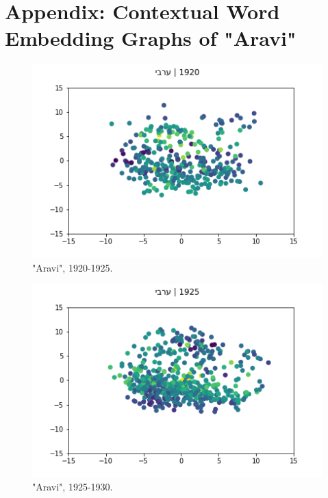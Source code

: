 \documentclass[10pt, a4paper]{article}
\begin{document}
\section*{Appendix: Contextual Word Embedding Graphs of "Aravi"}
\begin{figure}[!h]
\begin{center}
\includegraphics[scale=0.5]{LREC_PAPER/aravi_cwes/aravi_1920.png}
\caption{"Aravi", 1920-1925.}
\label{Aravi1}
\end{center}
\end{figure}

\begin{figure}[!h]
\begin{center}
\includegraphics[scale=0.5]{LREC_PAPER/aravi_cwes/aravi_1925.png}
\caption{"Aravi", 1925-1930.}
\label{Aravi2}
\end{center}
\end{figure}
\end{document}

